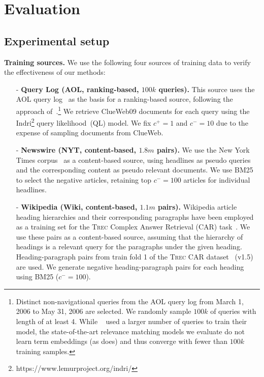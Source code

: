 \section{Evaluation} 
\label{sec.evaluation}

\subsection{Experimental setup}\label{sec.expsetting}

\textbf{Training sources.} We use the following four sources of training data to verify the effectiveness of our methods:
\begin{itemize}[leftmargin=*]
\item[-] \textbf{Query Log (AOL, ranking-based, $100k$ queries).}
This source uses the AOL query log~\cite{pass2006} as the basis for a ranking-based source, following the approach of~\cite{dehghani2017neural}.\footnote{
Distinct non-navigational queries from the AOL query log from March 1, 2006 to May 31, 2006 are selected. We randomly sample $100k$ of queries with length of at least 4. While \citeauthor{dehghani2017neural}~\cite{dehghani2017neural} used a larger number of queries to train their model, the state-of-the-art relevance matching models we evaluate do not learn term embeddings (as \cite{dehghani2017neural} does) and thus converge with fewer than $100k$ training samples.}
We retrieve ClueWeb09 documents for each query using the Indri\footnote{https://www.lemurproject.org/indri/} query likelihood~(QL) model. We fix $c^+=1$ and $c^-=10$ due to the expense of sampling documents from ClueWeb.

\item[-] \textbf{Newswire (NYT, content-based, $1.8m$ pairs).} 
We use the New York Times corpus~\cite{sandhaus2008new} as a content-based source, using headlines as pseudo queries and the corresponding content as pseudo relevant documents. We use BM25 to select the negative articles, retaining top $c^-=100$ articles for individual headlines.

\item[-] 
\textbf{Wikipedia (Wiki, content-based, $1.1m$ pairs).} 
Wikipedia article heading hierarchies and their corresponding paragraphs have been employed as a training set for the \textsc{Trec} Complex Answer Retrieval (CAR) task~\cite{Nanni2017BenchmarkFC,macavaney2018overcoming}.
We use these pairs as a content-based source, assuming that the hierarchy of headings is a relevant query for the paragraphs under the given heading.
Heading-paragraph pairs from train fold 1 of the \textsc{Trec} CAR dataset~\cite{Dietz2017} (v1.5) are used. We generate negative heading-paragraph pairs for each heading using BM25 ($c^-=100$).


\end{itemize}
